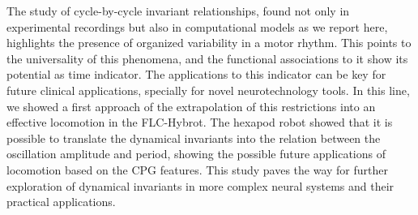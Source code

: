 The study of cycle-by-cycle invariant relationships, found not only in experimental recordings but also in computational models as we report here, highlights the presence of organized variability in a motor rhythm. This points to the universality of this phenomena, and the functional associations to it show its potential as time indicator. The applications to this indicator can be key for future clinical applications, specially for novel neurotechnology tools. In this line, we showed a first approach of the extrapolation of this restrictions into an effective locomotion in the FLC-Hybrot. The hexapod robot  showed that it is possible to translate the dynamical invariants into the relation between the oscillation amplitude and period, showing the possible future applications of locomotion based on the CPG features. This study paves the way for further exploration of dynamical invariants in more complex neural systems and their practical applications.









